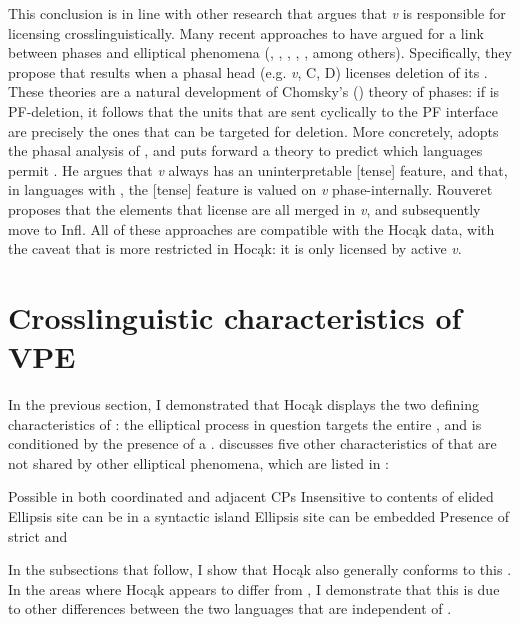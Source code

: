 \documentclass[output=paper]{LSP/langsci}
\begin{document}
This conclusion is in line with other research that argues that \emph{v} is responsible for licensing  crosslinguistically. Many recent approaches to  have argued for a link between phases and elliptical phenomena (\citealt{Holmberg2001}, \citealt{vanCraenenbroeck2004}, \citealt{Gengel2007},  \citealt{YoshidaGallego2008}, \citealt{Gallego2009}, among others). Specifically, they propose that  results when a phasal head (e.g. \emph{v}, C, D) licenses deletion of its . These theories are a natural development of Chomsky's (\citeyear{Chomsky2000,Chomsky2001b,Chomsky2004}) theory of phases: if  is PF-deletion, it follows that the units that are sent cyclically to the PF interface are precisely the ones that can be targeted for deletion. More concretely, \citet{Rouveret2012} adopts the phasal analysis of , and puts forward a theory to predict which languages permit . He argues that \emph{v} always has an uninterpretable [tense] feature, and that, in languages with , the [tense] feature is valued on \emph{v} phase-internally. Rouveret proposes that the elements that license  are all merged in \emph{v}, and subsequently move to Infl. All of these approaches are compatible with the Hocąk data, with the caveat that  is more restricted in Hocąk: it is only licensed by active \emph{v}.


\section{Crosslinguistic characteristics of VPE}\label{sec:johnson:3}

In the previous section, I demonstrated that Hocąk displays the two defining characteristics of : the elliptical process in question targets the entire , and is conditioned by the presence of a . \citet{Goldberg2005} discusses five other characteristics of  that are not shared by other elliptical phenomena, which are listed in : 
 
\ea\label{ex:johnson:24}
\ea 
Possible in both coordinated and adjacent CPs
\ex 
Insensitive to contents of elided 
\ex 
Ellipsis site can be in a syntactic island
\ex 
Ellipsis site can be embedded
\ex 
Presence of strict and 
\z
\z


In the subsections that follow, I show that Hocąk  also generally conforms to this . In the areas where Hocąk appears to differ from , I demonstrate that this is due to other differences between the two languages that are independent of .
\end{document}
